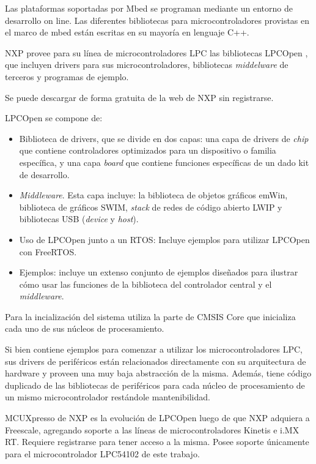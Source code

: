 Las plataformas soportadas por Mbed se programan mediante un entorno de desarrollo on line. Las diferentes bibliotecas para microcontroladores provistas en el marco de mbed están escritas en su mayoría en lenguaje C++.


NXP provee para su línea de microcontroladores LPC las bibliotecas LPCOpen \citep{LPCOpenNXP}, que incluyen drivers para sus microcontroladores, bibliotecas \emph{middelware} de terceros y programas de ejemplo. 

Se puede descargar de forma gratuita de la web de NXP sin registrarse.

LPCOpen se compone de:

\begin{itemize}
\item
Biblioteca de drivers, que se divide en dos capas: una capa de drivers de \emph{chip} que contiene controladores optimizados para un dispositivo o familia específica, y una capa \emph{board} que contiene funciones específicas de un dado kit de desarrollo.
\item
\emph{Middleware}. Esta capa incluye: la biblioteca de objetos gráficos emWin, biblioteca de gráficos SWIM, \emph{stack} de redes de código abierto LWIP y bibliotecas USB (\emph{device} y \emph{host}).
\item
Uso de LPCOpen junto a un RTOS: Incluye ejemplos para utilizar LPCOpen con FreeRTOS.
\item
Ejemplos: incluye un extenso conjunto de ejemplos diseñados para ilustrar cómo usar las funciones de la biblioteca del controlador central y el \emph{middleware}.
\end{itemize}

Para la incialización del sistema utiliza la parte de CMSIS Core que inicializa cada uno de sus núcleos de procesamiento.

Si bien contiene ejemplos para comenzar a utilizar los microcontroladores LPC, sus drivers de periféricos están relacionados directamente con su arquitectura de hardware y proveen una muy baja abstracción de la misma. Además, tiene código duplicado de las bibliotecas de periféricos para cada núcleo de procesamiento de un mismo microcontrolador restándole mantenibilidad.

MCUXpresso \citep{MCUXpresso} de NXP es la evolución de LPCOpen luego de que NXP adquiera a Freescale,  agregando soporte a las líneas de microcontroladores Kinetis e i.MX RT. Requiere registrarse para tener acceso a la misma. Posee soporte únicamente para el microcontrolador LPC54102 de este trabajo.

